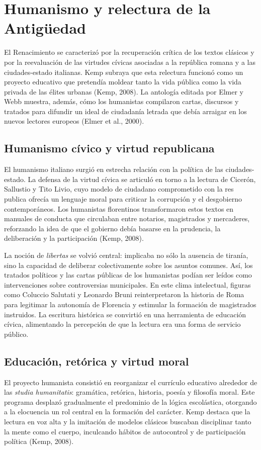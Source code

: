 \chapter{Humanismo y relectura de la Antigüedad}
El Renacimiento se caracterizó por la recuperación crítica de los textos clásicos y por la reevaluación de las virtudes cívicas asociadas a la república romana y a las ciudades-estado italianas. Kemp subraya que esta relectura funcionó como un proyecto educativo que pretendía moldear tanto la vida pública como la vida privada de las élites urbanas (Kemp, 2008). La antología editada por Elmer y Webb muestra, además, cómo los humanistas compilaron cartas, discursos y tratados para difundir un ideal de ciudadanía letrada que debía arraigar en los nuevos lectores europeos (Elmer et al., 2000).

\section{Humanismo cívico y virtud republicana}
El humanismo italiano surgió en estrecha relación con la política de las ciudades-estado. La defensa de la virtud cívica se articuló en torno a la lectura de Cicerón, Sallustio y Tito Livio, cuyo modelo de ciudadano comprometido con la res publica ofrecía un lenguaje moral para criticar la corrupción y el desgobierno contemporáneos. Los humanistas florentinos transformaron estos textos en manuales de conducta que circulaban entre notarios, magistrados y mercaderes, reforzando la idea de que el gobierno debía basarse en la prudencia, la deliberación y la participación (Kemp, 2008).

La noción de \emph{libertas} se volvió central: implicaba no sólo la ausencia de tiranía, sino la capacidad de deliberar colectivamente sobre los asuntos comunes. Así, los tratados políticos y las cartas públicas de los humanistas podían ser leídos como intervenciones sobre controversias municipales. En este clima intelectual, figuras como Coluccio Salutati y Leonardo Bruni reinterpretaron la historia de Roma para legitimar la autonomía de Florencia y estimular la formación de magistrados instruidos. La escritura histórica se convirtió en una herramienta de educación cívica, alimentando la percepción de que la lectura era una forma de servicio público.

\section{Educación, retórica y virtud moral}
El proyecto humanista consistió en reorganizar el currículo educativo alrededor de las \emph{studia humanitatis}: gramática, retórica, historia, poesía y filosofía moral. Este programa desplazó gradualmente el predominio de la lógica escolástica, otorgando a la elocuencia un rol central en la formación del carácter. Kemp destaca que la lectura en voz alta y la imitación de modelos clásicos buscaban disciplinar tanto la mente como el cuerpo, inculcando hábitos de autocontrol y de participación política (Kemp, 2008).

